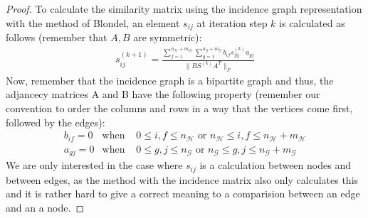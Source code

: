 \documentclass[a4paper,11pt]{report}
\newcommand{\hgraf}{\mathcal{G}}
\newcommand{\hgrafeen}{\mathcal{H}}
\begin{document}
 \begin{proof}
To calculate the similarity matrix using the incidence graph representation with the method of Blondel, an element $s_{ij}$ at iteration step $k$ is calculated as follows
(remember that $A, B$ are symmetric):
\begin{eqnarray}\label{simisimi}
s^{(k+1)}_{ij} = \frac{\sum^{n_\hgrafeen + m_\hgrafeen}_{f=1}\sum^{n_\hgraf + m_\hgraf}_{g=1} b_{if}s^{(k)}_{fg}a_{gj}}{\|BS^{(k)}A^T\|_F}
\end{eqnarray}
Now, remember that the incidence graph is a bipartite graph and thus, the 
adjancecy matrices A and B have the following property (remember our convention to order the columns and rows in a way that the vertices come first, followed by the edges):
\begin{eqnarray}\label{nulpoints}
b_{if} = 0  &\text{when }& 0 \leq i,f \leq n_\hgrafeen \text{ or } n_\hgrafeen \leq i,f \leq n_\hgrafeen + 
m_\hgrafeen\\
a_{gj} = 0  &\text{when }& 0 \leq g,j \leq n_\hgraf \text{ or } n_\hgraf \leq g,j \leq n_\hgraf + m_\hgraf
\end{eqnarray}
We are only interested in the case where $s_{ij}$ is a calculation between nodes 
and between edges, as the method with the incidence matrix also only calculates 
this and it is rather hard to give a correct meaning to a comparision between an 
edge and an a node. 


\end{proof}
\end{document}
